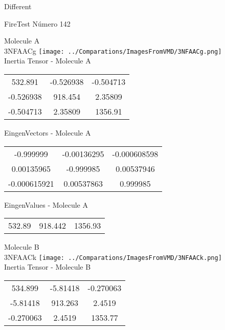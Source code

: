\begin{center}
\vtab
\vtab
\textcolor{NavyBlue}{\Large Different}
\end{center}

 \newpage

\vtab[-2cm]
\begin{center}
{\large FireTest \tab Número 142}
\end{center}
\begin{multicols}{2}
\begin{center}

Molecule A \\ 
3NFAACg
\texttt{[image: ../Comparations/ImagesFromVMD/3NFAACg.png]}
\\
Inertia Tensor - Molecule A \\
\vtab

\begin{tabular}{|c c c|}
532.891	 & 	-0.526938	 & 	-0.504713	 \\
-0.526938	 & 	918.454	 & 	2.35809	 \\
-0.504713	 & 	2.35809	 & 	1356.91
\end{tabular}

\vtab
 EingenVectors - Molecule A     \\
\vtab
\begin{tabular}{|c c c|}
-0.999999	 & 	-0.00136295	 & 	-0.000608598	 \\
0.00135965	 & 	-0.999985	 & 	0.00537946	 \\
-0.000615921	 & 	0.00537863	 & 	0.999985
\end{tabular}

\vtab
 EingenValues - Molecule A     \\
\vtab
\begin{tabular}{|c c c|}
532.89	 & 	918.442	 & 	1356.93	 \\
\end{tabular}
\columnbreak

Molecule B \\ 
3NFAACk
\texttt{[image: ../Comparations/ImagesFromVMD/3NFAACk.png]}
\\
Inertia Tensor - Molecule B \\
\vtab

\begin{tabular}{|c c c|}
534.899	 & 	-5.81418	 & 	-0.270063	 \\
-5.81418	 & 	913.263	 & 	2.4519	 \\
-0.270063	 & 	2.4519	 & 	1353.77
\end{tabular}


\end{center}
\end{multicols}
